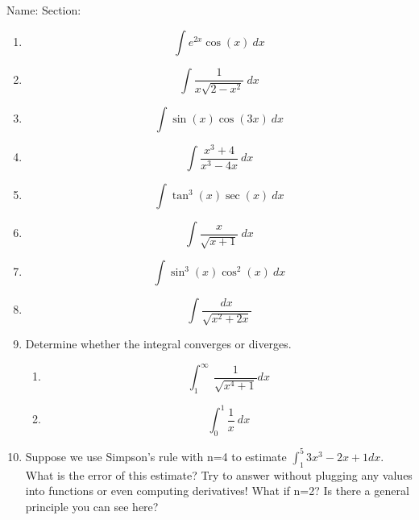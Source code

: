 \documentclass[12pt]{article}
\begin{document}
\noindent Name: \hspace{4in}Section:
\vspace{0.5cm}



\begin{enumerate}
\item \[\int e^{2x} \cos(x)\:dx\]
\vfill

\item \[\int \frac{1}{x\sqrt{2-x^2}} \: dx\] \vfill




\newpage

\item\[\int \sin(x) \cos(3x) \: dx \]
\vfill


\item \[\int \frac{x^3+4}{x^3-4x} \:dx \]
\vfill
\newpage

\item \[\int \tan^3 (x) \sec (x)\:dx \]

\vfill
\item \[\int \frac{x}{\sqrt{x+1}}\: dx \]

\vfill

\newpage
\item \[ \int \sin^3(x) \cos^2(x) \: dx \]
\vfill
\item \[ \int \frac{dx}{\sqrt{x^2+2x}}\]
\vfill


\newpage
\item Determine whether the integral converges or diverges.
\begin{enumerate}
\item \[\int_1^\infty \: \frac{1}{\sqrt{x^4+1}} dx\]
\vfill
\item \[ \int_0^1 \frac{1}{x}\: dx\]
\vfill
\end{enumerate}
\item Suppose we use Simpson's rule with n=4 to estimate $\int_1^5 3x^3-2x+1 dx$.  What is the error of this estimate?  Try to answer without plugging any values into functions or even computing derivatives!  What if n=2?  Is there a general principle you can see here?
 
\vfill
\vfill



\end{enumerate}
\end{document}

